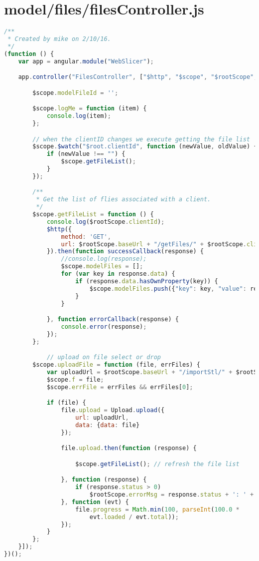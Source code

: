 \section{model/files/filesController.js}
\begin{lstlisting}[language=JavaScript, label={lst:filesController}, caption=filesController.js handles all requests for uploading files to the server.]
/**
 * Created by mike on 2/10/16.
 */
(function () {
    var app = angular.module("WebSlicer");

    app.controller("FilesController", ["$http", "$scope", "$rootScope", "Upload", "OctoprintService", function ($http, $scope, $rootScope, Upload, OctoprintService) {

        $scope.modelFileId = '';

        $scope.logMe = function (item) {
            console.log(item);
        };

        // when the clientID changes we execute getting the file list
        $scope.$watch("$root.clientId", function (newValue, oldValue) {
            if (newValue !== "") {
                $scope.getFileList();
            }
        });

        /**
         * Get the list of flies associated with a client.
         */
        $scope.getFileList = function () {
            console.log($rootScope.clientId);
            $http({
                method: 'GET',
                url: $rootScope.baseUrl + "/getFiles/" + $rootScope.clientId
            }).then(function successCallback(response) {
                //console.log(response);
                $scope.modelFiles = [];
                for (var key in response.data) {
                    if (response.data.hasOwnProperty(key)) {
                        $scope.modelFiles.push({"key": key, "value": response.data[key]});
                    }
                }

            }, function errorCallback(response) {
                console.error(response);
            });
        };

            // upload on file select or drop
        $scope.uploadFile = function (file, errFiles) {
            var uploadUrl = $rootScope.baseUrl + "/importStl/" + $rootScope.clientId;
            $scope.f = file;
            $scope.errFile = errFiles && errFiles[0];

            if (file) {
                file.upload = Upload.upload({
                    url: uploadUrl,
                    data: {data: file}
                });

                file.upload.then(function (response) {

                    $scope.getFileList(); // refresh the file list

                }, function (response) {
                    if (response.status > 0)
                        $rootScope.errorMsg = response.status + ': ' + response.data;
                }, function (evt) {
                    file.progress = Math.min(100, parseInt(100.0 *
                        evt.loaded / evt.total));
                });
            }
        };
    }]);
})();
\end{lstlisting}


